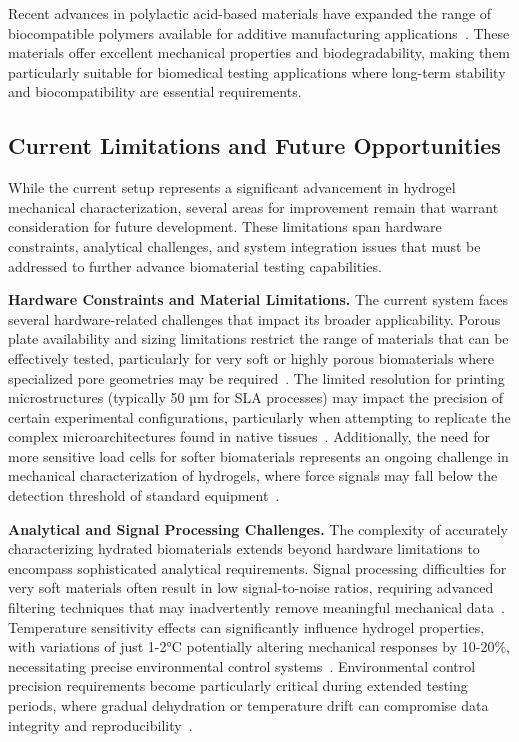 Recent advances in polylactic acid-based materials have expanded the range of biocompatible polymers available for additive manufacturing applications~\cite{maleki2022polylacticacidbased}. These materials offer excellent mechanical properties and biodegradability, making them particularly suitable for biomedical testing applications where long-term stability and biocompatibility are essential requirements.

\subsection{Current Limitations and Future Opportunities}

While the current setup represents a significant advancement in hydrogel mechanical characterization, several areas for improvement remain that warrant consideration for future development. These limitations span hardware constraints, analytical challenges, and system integration issues that must be addressed to further advance biomaterial testing capabilities.

\textbf{Hardware Constraints and Material Limitations.} The current system faces several hardware-related challenges that impact its broader applicability. Porous plate availability and sizing limitations restrict the range of materials that can be effectively tested, particularly for very soft or highly porous biomaterials where specialized pore geometries may be required~\cite{rowley1999alginatehydrogels,schinagl1996videomicroscopy,patel2019systematicreview}. The limited resolution for printing microstructures (typically 50 µm for SLA processes) may impact the precision of certain experimental configurations, particularly when attempting to replicate the complex microarchitectures found in native tissues~\cite{bercea2024recent, luis20203dprinted,jaidev2019surfacefunctionalization,jongerius2010structuralanalysis,jurvelin2000topographicalvariation}. Additionally, the need for more sensitive load cells for softer biomaterials represents an ongoing challenge in mechanical characterization of hydrogels, where force signals may fall below the detection threshold of standard equipment~\cite{patel2019systematicreview, xiao2013mechanicaltesting}.

\textbf{Analytical and Signal Processing Challenges.} The complexity of accurately characterizing hydrated biomaterials extends beyond hardware limitations to encompass sophisticated analytical requirements. Signal processing difficulties for very soft materials often result in low signal-to-noise ratios, requiring advanced filtering techniques that may inadvertently remove meaningful mechanical data~\cite{chaudhuri2016hydrogelstunable}. Temperature sensitivity effects can significantly influence hydrogel properties, with variations of just 1-2°C potentially altering mechanical responses by 10-20\%, necessitating precise environmental control systems~\cite{antoine2014review, nichol2010cellviability}. Environmental control precision requirements become particularly critical during extended testing periods, where gradual dehydration or temperature drift can compromise data integrity and reproducibility~\cite{seitz2013stressrelaxationresponse}.

